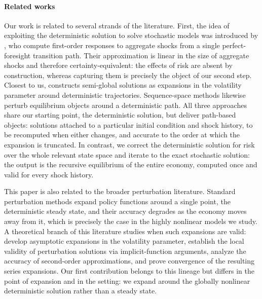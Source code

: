 \documentclass[11pt]{article}
\begin{document}
\paragraph{Related works} Our work is related to several strands of the
literature. First, the idea of exploiting the deterministic solution to solve
stochastic models was introduced by \citet{boppart2018exploiting}, who compute
first-order responses to aggregate shocks from a single perfect-foresight
transition path. Their approximation is linear in the size of aggregate shocks
and therefore certainty-equivalent: the effects of risk are absent by
construction, whereas capturing them is precisely the object of our second
step. Closest to us, \citet{ajevskis2017semiglobal} constructs semi-global
solutions as expansions in the volatility parameter around deterministic
trajectories. Sequence-space methods
\citep{auclert2021sequence} likewise perturb equilibrium objects around a
deterministic path. All three approaches share our starting point, the deterministic solution,
but deliver path-based objects: solutions attached to a particular initial condition and
shock history, to be recomputed when either changes, and accurate to the order
at which the expansion is truncated. In contrast, we correct the deterministic
solution for risk over the whole relevant state space and iterate to the exact
stochastic solution: the output is the recursive equilibrium of the entire
economy, computed once and valid for every shock history.

This paper is also related to the broader perturbation literature. Standard
perturbation methods \citep{schmitt2004solving, fernandez2016solution} expand
policy functions around a single point, the deterministic steady state, and
their accuracy degrades as the economy moves away from it, which is precisely
the case in the highly nonlinear models we study. A theoretical branch of this
literature studies when such expansions are valid: \citet{judd2001asymptotic}
develop asymptotic expansions in the volatility parameter,
\citet{jin2002perturbation} establish the local validity of perturbation
solutions via implicit-function arguments, \citet{kim2008calculating} analyze
the accuracy of second-order approximations, and \citet{lombardo2018theory}
prove convergence of the resulting series expansions. Our first contribution belongs to this lineage but differs in the point of
expansion and in the setting: we expand around the globally nonlinear
deterministic solution rather than a steady state. 
\end{document}
